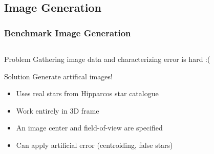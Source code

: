 \documentclass[11pt]{beamer}
\begin{document}
    \subsection{Image Generation}\label{subsec:imageGeneration}
    \begin{frame}
        \frametitle{Benchmark Image Generation}
        \begin{columns}
            \begin{column}{0.5\textwidth}
                \begin{block}{Problem}
                    Gathering image data and characterizing error is hard :(
                \end{block} \medskip
                \begin{block}{Solution}
                    Generate artifical images!
                    \begin{itemize}
                        \item Uses real stars from Hipparcos star catalogue
                        \item Work entirely in 3D frame
                        \item An image center and field-of-view are specified
                        \item Can apply artificial error (centroiding, false stars)
                    \end{itemize}
                \end{block}
            \end{column}
            \begin{column}{0.5\textwidth}
                \hspace*{-2pt}
            \end{column}
        \end{columns}
    \end{frame}
\end{document}
